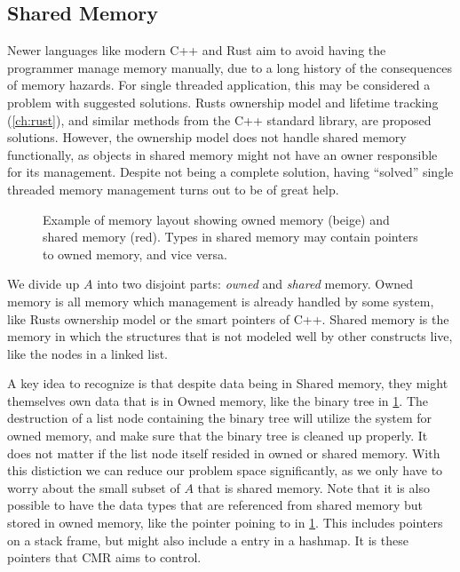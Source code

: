 \subsection{Shared Memory}

Newer languages like modern C++ and Rust aim to avoid having the programmer manage memory manually,
due to a long history of the consequences of memory hazards. For single threaded application, this
may be considered a problem with suggested solutions. Rusts ownership model and lifetime tracking
(\cref{ch:rust}), and similar methods from the C++ standard library, are proposed solutions.
However, the ownership model does not handle shared memory functionally, as objects in shared
memory might not have an owner responsible for its management. Despite not being a complete
solution, having ``solved'' single threaded memory management turns out to be of great help.

\begin{figure}[ht]
  \centering
  
  \caption{Example of memory layout showing owned memory (beige) and shared memory (red). Types in
  shared memory may contain pointers to owned memory, and vice versa.\label{fig:rust-shared-mem}}
\end{figure}

We divide up $A$ into two disjoint parts: \emph{owned} and \emph{shared} memory.  Owned memory is
all memory which management is already handled by some system, like Rusts ownership model or the
smart pointers of C++. Shared memory is the memory in which the structures that is not modeled well
by other constructs live, like the nodes in a linked list.

A key idea to recognize is that despite data being in Shared memory, they might themselves own data
that is in Owned memory, like the binary tree in \cref{fig:rust-shared-mem}. The destruction of a
list node containing the binary tree will utilize the system for owned memory, and make sure that
the binary tree is cleaned up properly. It does not matter if the list node itself resided in owned
or shared memory.  With this distiction we can reduce our problem space significantly, as we only
have to worry about the small subset of $A$ that is shared memory.  Note that it is also possible
to have the data types that are referenced from shared memory but stored in owned memory, like the
pointer poining to  in \cref{fig:rust-shared-mem}.  This includes pointers on a stack
frame, but might also include a entry in a hashmap. It is these pointers that CMR aims to control.


